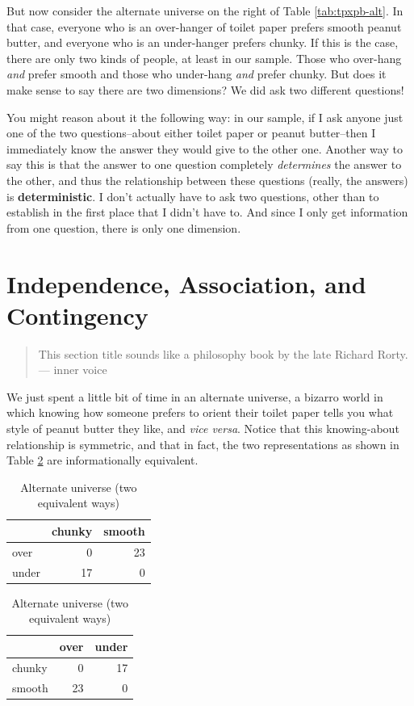 \documentclass[
  openany]{book}
\begin{document}
But now consider the alternate universe on the right of Table \ref{tab:tpxpb-alt}. In that case, everyone who is an over-hanger of toilet paper prefers smooth peanut butter, and everyone who is an under-hanger prefers chunky. If this is the case, there are only two kinds of people, at least in our sample. Those who over-hang \emph{and} prefer smooth and those who under-hang \emph{and} prefer chunky. But does it make sense to say there are two dimensions? We did ask two different questions!

You might reason about it the following way: in our sample, if I ask anyone just one of the two questions--about either toilet paper or peanut butter--then I immediately know the answer they would give to the other one. Another way to say this is that the answer to one question completely \emph{determines} the answer to the other, and thus the relationship between these questions (really, the answers) is \textbf{deterministic}. I don't actually have to ask two questions, other than to establish in the first place that I didn't have to. And since I only get information from one question, there is only one dimension.

\hypertarget{independence-association-and-contingency}{%
\section*{Independence, Association, and Contingency}\label{independence-association-and-contingency}}

\begin{quote}
This section title sounds like a philosophy book by the late Richard Rorty.
--- inner voice
\end{quote}

We just spent a little bit of time in an alternate universe, a bizarro world in which knowing how someone prefers to orient their toilet paper tells you what style of peanut butter they like, and \emph{vice versa}. Notice that this knowing-about relationship is symmetric, and that in fact, the two representations as shown in Table \ref{tab:tpxpb-alt2way} are informationally equivalent.

\begin{table}[!h]
\caption{\label{tab:tpxpb-alt2way}Alternate universe (two equivalent ways)}

\centering
\begin{tabular}[t]{lrr}
\toprule
  & chunky & smooth\\
\midrule
over & 0 & 23\\
under & 17 & 0\\
\bottomrule
\end{tabular}
\centering
\begin{tabular}[t]{lrr}
\toprule
  & over & under\\
\midrule
chunky & 0 & 17\\
smooth & 23 & 0\\
\bottomrule
\end{tabular}
\end{table}
\end{document}

